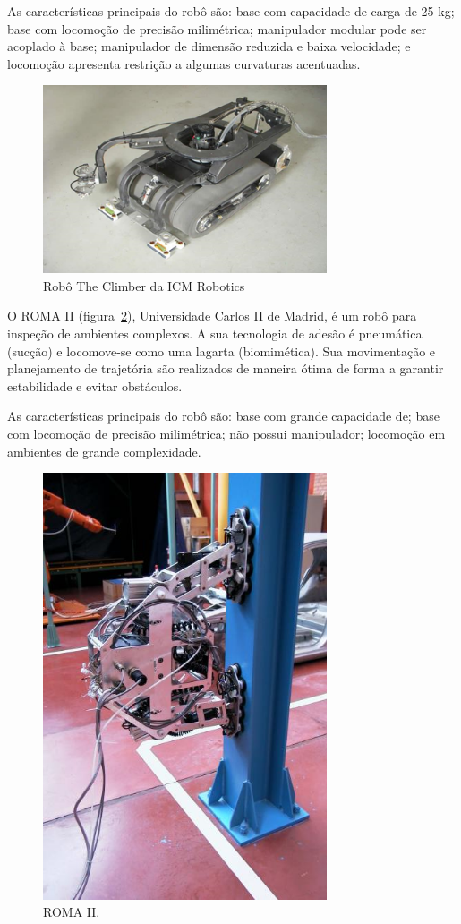 As características principais do robô são: base com capacidade de carga de 25
kg; base com locomoção de precisão milimétrica; manipulador modular pode ser
acoplado à base; manipulador de dimensão reduzida e baixa velocidade; e
locomoção apresenta restrição a algumas curvaturas acentuadas.

\begin{figure}[ht]
\centering
\includegraphics[width=8.4cm]{figs/climbers/icm.png}
\caption{Robô The Climber da ICM Robotics}
\label{icm}
\end{figure}

O ROMA II (figura~\ref{roma2}), Universidade Carlos II de Madrid, é um robô para
inspeção de ambientes complexos. A sua tecnologia de adesão é pneumática (sucção) e
locomove-se como uma lagarta (biomimética). Sua movimentação e planejamento de
trajetória são realizados de maneira ótima de forma a garantir estabilidade e
evitar obstáculos. 

As características principais do robô são: base com grande capacidade de; base
com locomoção de precisão milimétrica; não possui manipulador; locomoção em
ambientes de grande complexidade.

\begin{figure}[ht]
\centering
\includegraphics[width=8.4cm]{figs/climbers/roma2.jpg}
\caption{ROMA II.}
\label{roma2}
\end{figure}

